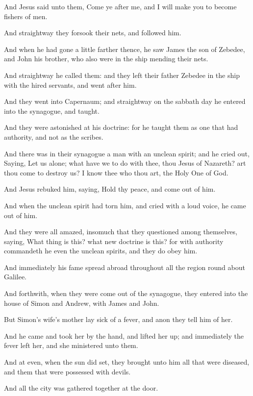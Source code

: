 \verse And Jesus said unto them, Come ye after me, and I will make you to become fishers of men.

\verse And straightway they forsook their nets, and followed him.

\verse And when he had gone a little farther thence, he saw James the son of Zebedee, and John his brother, who also were in the ship mending their nets.

\verse And straightway he called them: and they left their father Zebedee in the ship with the hired servants, and went after him.

\verse And they went into Capernaum; and straightway on the sabbath day he entered into the synagogue, and taught.

\verse And they were astonished at his doctrine: for he taught them as one that had authority, and not as the scribes.

\verse And there was in their synagogue a man with an unclean spirit; and he cried out, \verse Saying, Let us alone; what have we to do with thee, thou Jesus of Nazareth? art thou come to destroy us? I know thee who thou art, the Holy One of God.

\verse And Jesus rebuked him, saying, Hold thy peace, and come out of him.

\verse And when the unclean spirit had torn him, and cried with a loud voice, he came out of him.

\verse And they were all amazed, insomuch that they questioned among themselves, saying, What thing is this? what new doctrine is this? for with authority commandeth he even the unclean spirits, and they do obey him.

\verse And immediately his fame spread abroad throughout all the region round about Galilee.

\verse And forthwith, when they were come out of the synagogue, they entered into the house of Simon and Andrew, with James and John.

\verse But Simon's wife's mother lay sick of a fever, and anon they tell him of her.

\verse And he came and took her by the hand, and lifted her up; and immediately the fever left her, and she ministered unto them.

\verse And at even, when the sun did set, they brought unto him all that were diseased, and them that were possessed with devils.

\verse And all the city was gathered together at the door.

